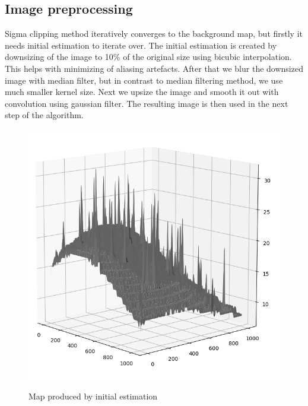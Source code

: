 \documentclass[12pt, a4paper, oneside]{book}
\begin{document}
\subsection{Image preprocessing}
Sigma clipping method iteratively converges to the background map, but firstly it needs initial estimation to iterate over.
The initial estimation is created by downsizing of the image to 10\% of the original size using bicubic interpolation.
This helps with minimizing of aliasing artefacts.
After that we blur the downsized image with median filter, but in contrast to median filtering method, we use much smaller kernel size.
Next we upsize the image and smooth it out with convolution using gaussian filter.
The resulting image is then used in the next step of the algorithm.

\begin{figure}[!hbt]
    \begin{center}
        \includegraphics[scale=1.30]{images/background_initial_guess.png}
        \label{img:background_initial_guess}
        \caption{Map produced by initial estimation}
    \end{center}
\end{figure}
\end{document}
